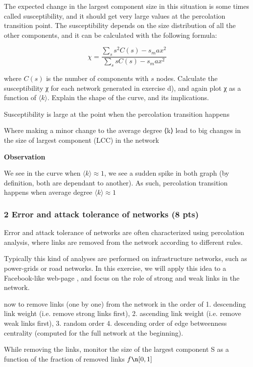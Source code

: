 \documentclass[11pt]{article}
\begin{document}
The expected change in the largest component size in this situation is
some times called susceptibility, and it should get very large values at
the percolation transition point. The susceptibility depends on the size
distribution of all the other components, and it can be calculated with
the following formula:

\[χ = \frac{\sum_s s^2 C(s) - s_max^2}{\sum_s s C(s) - s_max^2}\]

where \(C(s)\) is the number of components with \(s\) nodes. Calculate
the susceptibility χ for each network generated in exercise d), and
again plot χ as a function of \(\langle k \rangle\). Explain the shape
of the curve, and its implications.

    Susceptibility is large at the point when the percolation transition
happens

Where making a minor change to the average degree ⟨k⟩ lead to big
changes in the size of largest component (LCC) in the network

\textbf{Observation}

We see in the curve when \(⟨k⟩ \approx 1\), we see a sudden spike in
both graph (by definition, both are dependant to another). As such,
percolation transition happens when average degree \(⟨k⟩ \approx 1\)

    \subsubsection{2 Error and attack tolerance of networks (8
pts)}\label{error-and-attack-tolerance-of-networks-8-pts}

Error and attack tolerance of networks are often characterized using
percolation analysis, where links are removed from the network according
to different rules.

Typically this kind of analyses are performed on infrastructure
networks, such as power-grids or road networks. In this exercise, we
will apply this idea to a Facebook-like web-page , and focus on the role
of strong and weak links in the network.

now to remove links (one by one) from the network in the order of 1.
descending link weight (i.e. remove strong links first), 2. ascending
link weight (i.e. remove weak links first), 3. random order 4.
descending order of edge betweenness centrality (computed for the full
network at the beginning).

While removing the links, monitor the size of the largest component S as
a function of the fraction of removed links \(f \n [0, 1]\)
\end{document}
